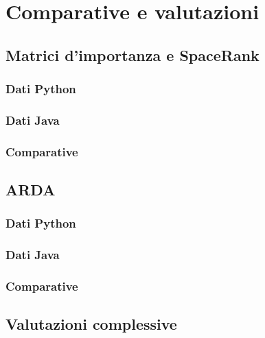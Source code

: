 \chapter{Comparative e valutazioni}

\section{Matrici d'importanza e SpaceRank}
\subsection{Dati Python}
\subsection{Dati Java}
\subsection{Comparative}

\section{ARDA}
\subsection{Dati Python}
\subsection{Dati Java}
\subsection{Comparative}

\section{Valutazioni complessive}
